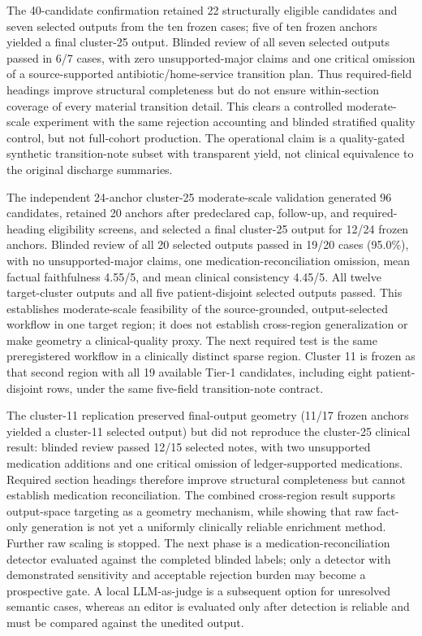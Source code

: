 \documentclass[11pt]{article}
\begin{document}
The 40-candidate confirmation retained 22 structurally eligible candidates and seven selected outputs from the ten frozen cases; five of ten frozen anchors yielded a final cluster-25 output. Blinded review of all seven selected outputs passed in 6/7 cases, with zero unsupported-major claims and one critical omission of a source-supported antibiotic/home-service transition plan. Thus required-field headings improve structural completeness but do not ensure within-section coverage of every material transition detail. This clears a controlled moderate-scale experiment with the same rejection accounting and blinded stratified quality control, but not full-cohort production. The operational claim is a quality-gated synthetic transition-note subset with transparent yield, not clinical equivalence to the original discharge summaries.

The independent 24-anchor cluster-25 moderate-scale validation generated 96 candidates, retained 20 anchors after predeclared cap, follow-up, and required-heading eligibility screens, and selected a final cluster-25 output for 12/24 frozen anchors. Blinded review of all 20 selected outputs passed in 19/20 cases (95.0\%), with no unsupported-major claims, one medication-reconciliation omission, mean factual faithfulness 4.55/5, and mean clinical consistency 4.45/5. All twelve target-cluster outputs and all five patient-disjoint selected outputs passed. This establishes moderate-scale feasibility of the source-grounded, output-selected workflow in one target region; it does not establish cross-region generalization or make geometry a clinical-quality proxy. The next required test is the same preregistered workflow in a clinically distinct sparse region. Cluster 11 is frozen as that second region with all 19 available Tier-1 candidates, including eight patient-disjoint rows, under the same five-field transition-note contract.

The cluster-11 replication preserved final-output geometry (11/17 frozen anchors yielded a cluster-11 selected output) but did not reproduce the cluster-25 clinical result: blinded review passed 12/15 selected notes, with two unsupported medication additions and one critical omission of ledger-supported medications. Required section headings therefore improve structural completeness but cannot establish medication reconciliation. The combined cross-region result supports output-space targeting as a geometry mechanism, while showing that raw fact-only generation is not yet a uniformly clinically reliable enrichment method. Further raw scaling is stopped. The next phase is a medication-reconciliation detector evaluated against the completed blinded labels; only a detector with demonstrated sensitivity and acceptable rejection burden may become a prospective gate. A local LLM-as-judge is a subsequent option for unresolved semantic cases, whereas an editor is evaluated only after detection is reliable and must be compared against the unedited output.
\end{document}
